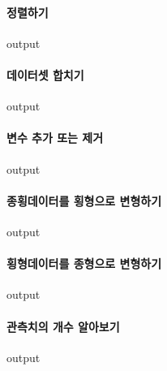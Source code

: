 \documentclass{report}
\begin{document}
\paragraph{정렬하기}
\begin{Schunk}
\begin{Soutput}
output
\end{Soutput}
\end{Schunk}

\paragraph{데이터셋 합치기}
\begin{Schunk}
\begin{Soutput}
output
\end{Soutput}
\end{Schunk}

\paragraph{변수 추가 또는 제거}
\begin{Schunk}
\begin{Soutput}
output
\end{Soutput}
\end{Schunk}

\paragraph{종횡데이터를 횡형으로 변형하기}
\begin{Schunk}
\begin{Soutput}
output
\end{Soutput}
\end{Schunk}

\paragraph{횡형데이터를 종형으로 변형하기}
\begin{Schunk}
\begin{Soutput}
output
\end{Soutput}
\end{Schunk}

\paragraph{관측치의 개수 알아보기}

\begin{Schunk}
\begin{Soutput}
output
\end{Soutput}
\end{Schunk}
\end{document}
